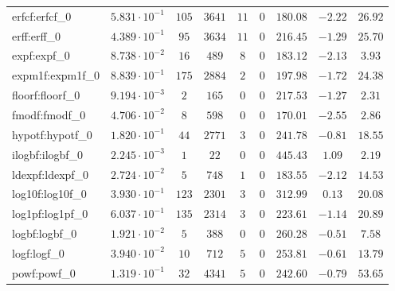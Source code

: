\begin{tabular}{|l|c|c|c|c|c|c|c|c|}
erfcf:erfcf\_0               & $ 5.831 \cdot 10^{-1} $ & $ 105    $ & $ 3641  $ & $ 11  $ & $ 0   $ & $ 180.08      $ & $ -2.22   $ & $ 26.92   $ \\
erff:erff\_0                 & $ 4.389 \cdot 10^{-1} $ & $ 95     $ & $ 3634  $ & $ 11  $ & $ 0   $ & $ 216.45      $ & $ -1.29   $ & $ 25.70   $ \\
expf:expf\_0                 & $ 8.738 \cdot 10^{-2} $ & $ 16     $ & $ 489   $ & $ 8   $ & $ 0   $ & $ 183.12      $ & $ -2.13   $ & $ 3.93    $ \\
expm1f:expm1f\_0             & $ 8.839 \cdot 10^{-1} $ & $ 175    $ & $ 2884  $ & $ 2   $ & $ 0   $ & $ 197.98      $ & $ -1.72   $ & $ 24.38   $ \\
floorf:floorf\_0             & $ 9.194 \cdot 10^{-3} $ & $ 2      $ & $ 165   $ & $ 0   $ & $ 0   $ & $ 217.53      $ & $ -1.27   $ & $ 2.31    $ \\
fmodf:fmodf\_0               & $ 4.706 \cdot 10^{-2} $ & $ 8      $ & $ 598   $ & $ 0   $ & $ 0   $ & $ 170.01      $ & $ -2.55   $ & $ 2.86    $ \\
hypotf:hypotf\_0             & $ 1.820 \cdot 10^{-1} $ & $ 44     $ & $ 2771  $ & $ 3   $ & $ 0   $ & $ 241.78      $ & $ -0.81   $ & $ 18.55   $ \\
ilogbf:ilogbf\_0             & $ 2.245 \cdot 10^{-3} $ & $ 1      $ & $ 22    $ & $ 0   $ & $ 0   $ & $ 445.43      $ & $ 1.09    $ & $ 2.19    $ \\
ldexpf:ldexpf\_0             & $ 2.724 \cdot 10^{-2} $ & $ 5      $ & $ 748   $ & $ 1   $ & $ 0   $ & $ 183.55      $ & $ -2.12   $ & $ 14.53   $ \\
log10f:log10f\_0             & $ 3.930 \cdot 10^{-1} $ & $ 123    $ & $ 2301  $ & $ 3   $ & $ 0   $ & $ 312.99      $ & $ 0.13    $ & $ 20.08   $ \\
log1pf:log1pf\_0             & $ 6.037 \cdot 10^{-1} $ & $ 135    $ & $ 2314  $ & $ 3   $ & $ 0   $ & $ 223.61      $ & $ -1.14   $ & $ 20.89   $ \\
logbf:logbf\_0               & $ 1.921 \cdot 10^{-2} $ & $ 5      $ & $ 388   $ & $ 0   $ & $ 0   $ & $ 260.28      $ & $ -0.51   $ & $ 7.58    $ \\
logf:logf\_0                 & $ 3.940 \cdot 10^{-2} $ & $ 10     $ & $ 712   $ & $ 5   $ & $ 0   $ & $ 253.81      $ & $ -0.61   $ & $ 13.79   $ \\
powf:powf\_0                 & $ 1.319 \cdot 10^{-1} $ & $ 32     $ & $ 4341  $ & $ 5   $ & $ 0   $ & $ 242.60      $ & $ -0.79   $ & $ 53.65   $ \\

\end{tabular}
